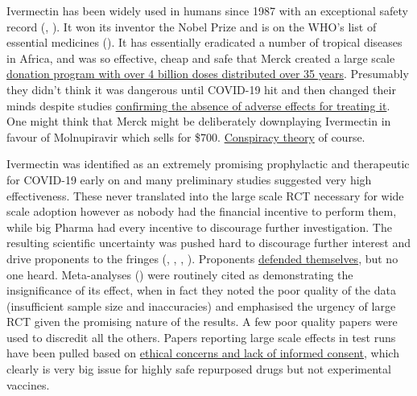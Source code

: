 \documentclass[11pt,a4paper]{article}
\begin{document}
Ivermectin has been widely used in humans since 1987 with an exceptional safety record (\cite{Smit2016-fq}, \cite{Crump2011-ev}). It won its inventor the Nobel Prize and is on the WHO’s list of essential medicines (\cite{Crump2017-qg}). It has essentially eradicated a number of tropical diseases in Africa, and was so effective, cheap and safe that Merck created a large scale \href{https://www.merck.com/stories/mectizan/}{donation program with over 4 billion doses distributed over 35 years}. Presumably they didn't think it was dangerous until COVID-19 hit and then changed their minds despite studies \href{https://academic.oup.com/ofid/article/8/Supplement_1/S365/6450290}{confirming the absence of adverse effects for treating it}. One might think that Merck might be deliberately downplaying Ivermectin in favour of Molnupiravir which sells  for \$700. \href{https://www.bloomberg.com/news/articles/2021-12-08/merck-s-mrk-covid-pill-must-first-overcome-anti-vax-ivermectin-misinformation}{Conspiracy theory} of course.

Ivermectin was identified as an extremely promising prophylactic and therapeutic for COVID-19 early on and many preliminary studies suggested very high effectiveness. These never translated into the large scale RCT necessary for wide scale adoption however as nobody had the financial incentive to perform them, while big Pharma had every incentive to discourage further investigation. The resulting scientific uncertainty was pushed hard to discourage further interest and drive proponents to the fringes (\cite{bbc06102021}, \cite{guardian13092021}, \cite{guardian24092021}, \cite{guardian24092021b}). Proponents \href{https://bird-group.org/the-bbcs-recent-article-false-science-is-disintegrating-under-scrutiny/}{defended themselves}, but no one heard. Meta-analyses (\cite{Popp21}) were routinely cited as demonstrating the insignificance of its effect, when in fact they noted the poor quality of the data (insufficient sample size and inaccuracies) and emphasised the urgency of large RCT given the promising nature of the results. A few poor quality papers were used to discredit all the others. Papers reporting large scale effects in test runs have been pulled based on \href{https://healthpolicy-watch.news/mexico-city-officials-in-row-over-misleading-paper-to-justify-its-ivermectin-drive/}{ethical concerns and lack of informed consent}, which clearly is very big issue for highly safe repurposed drugs but not experimental vaccines. 
\end{document}
